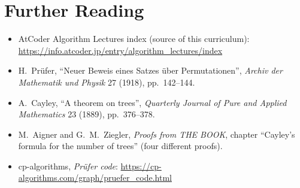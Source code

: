 \documentclass[11pt]{article}
\begin{document}
\section{Further Reading}
\begin{itemize}[leftmargin=1.5em]
  \item AtCoder Algorithm Lectures index (source of this curriculum):
        \url{https://info.atcoder.jp/entry/algorithm_lectures/index}
  \item H.\ Prüfer, ``Neuer Beweis eines Satzes über Permutationen'',
        \emph{Archiv der Mathematik und Physik} 27 (1918), pp.\ 142--144.
  \item A.\ Cayley, ``A theorem on trees'', \emph{Quarterly Journal of
        Pure and Applied Mathematics} 23 (1889), pp.\ 376--378.
  \item M.\ Aigner and G.\ M.\ Ziegler, \emph{Proofs from THE BOOK},
        chapter ``Cayley's formula for the number of trees'' (four
        different proofs).
  \item cp-algorithms, \emph{Prüfer code}:
        \url{https://cp-algorithms.com/graph/pruefer_code.html}
\end{itemize}
\end{document}
